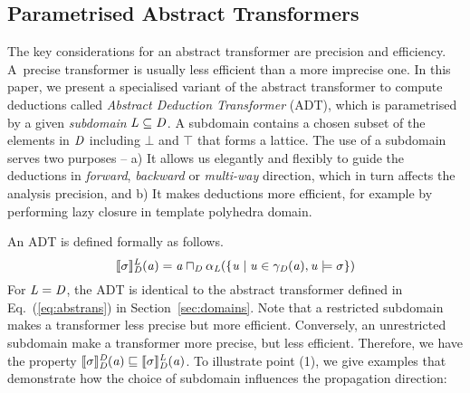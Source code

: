 \subsection{Parametrised Abstract Transformers} \label{sec:abst}

The key considerations for an abstract transformer are precision and
efficiency.  A~precise transformer is usually less efficient than a more
imprecise one.  In this paper, we present a specialised variant of the
abstract transformer to compute deductions called \emph{Abstract Deduction
Transformer} (ADT), which is parametrised by a given \emph{subdomain}
$\mathit{L}\subseteq \mathit{D}$.
%
A subdomain contains a chosen subset of the elements in $\mathit{D}$ including
$\bot$ and $\top$ that forms a lattice.
%
The use of a subdomain serves two purposes -- 
  a) It allows us elegantly and flexibly to guide the deductions in 
  {\em forward}, {\em backward} or {\em multi-way} direction, which 
  in turn affects the analysis precision, and 
  b) It makes deductions more efficient, for example by performing lazy closure
  in template polyhedra domain. 
%



An ADT is defined formally  as follows. 
\begin{equation}\label{eq:at2}
\llbracket \sigma \rrbracket_{\mathit{D}}^{\mathit{L}}(\mathit{a})=\mathit{a}\sqcap_{\mathit{D}} \alpha_{\mathit{L}}(\{\mathit{u}\mid \mathit{u}\in\gamma_{\mathit{D}}(\mathit{a}), \mathit{u}\models \sigma\})
\end{equation}
For $\mathit{L}=\mathit{D}$, the ADT is
identical to the abstract transformer defined in
Eq.~(\ref{eq:abstrans}) in Section~\ref{sec:domains}.  Note 
that a restricted subdomain makes a transformer less 
precise but more efficient.  Conversely, an
unrestricted subdomain make a transformer more precise, but less
efficient. Therefore, we have the property
$\llbracket \sigma \rrbracket_{\mathit{D}}^{\mathit{D}}(\mathit{a})\sqsubseteq
\llbracket \sigma \rrbracket_{\mathit{D}}^{\mathit{L}}(\mathit{a})$.
%
To illustrate point (1), 
we give examples that demonstrate how the choice of
subdomain influences the propagation direction:

